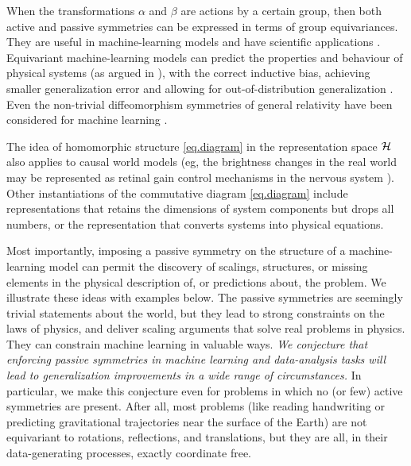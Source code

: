 \documentclass[11pt]{article}
\begin{document}
When the transformations $\alpha$ and $\beta$ are actions by a certain group, then both active and passive symmetries can be expressed in terms of group equivariances.
They are useful in machine-learning models \cite{cohen2016group, kondor2018convolution, thomas2018tensor, geiger2022e3nn, finzi2020generalizing, finzi2021practical} and have scientific applications \cite{batzner20223, musaelian2022learning, stark2022equibind, yu-physics, wang2022approximately}.
Equivariant machine-learning models can predict the properties and behaviour of physical systems (as argued in \cite{cheng2019covariance}), with the correct inductive bias, achieving smaller generalization error \cite{bietti2021sample, elesedy2021provably, elesedy2021kernel, mei2021learning} and allowing for out-of-distribution generalization \cite{villar2022dimensionless}. 
Even the non-trivial diffeomorphism symmetries of general relativity have been considered for machine learning \cite{weiler}.

The idea of homomorphic structure \eqref{eq.diagram} in the representation space $\cal H$ also applies to causal world models (eg, the brightness changes in the real world may be represented as retinal gain control mechanisms in the nervous system \cite{1911.10500}).
Other instantiations of the commutative diagram \eqref{eq.diagram} include representations that retains the dimensions of system components but drops all numbers, or the representation that converts systems into physical equations.

Most importantly, imposing a passive symmetry on the structure of a machine-learning model can permit the discovery of scalings, structures, or missing elements in the physical description of, or predictions about, the problem.
We illustrate these ideas with examples below.
The passive symmetries are seemingly trivial statements about the world, but they lead to strong constraints on the laws of physics, and deliver scaling arguments that solve real problems in physics.
They can constrain machine learning in valuable ways.
\emph{We conjecture that enforcing passive symmetries in machine learning and data-analysis tasks will lead to generalization improvements in a wide range of circumstances.}
In particular, we make this conjecture even for problems in which no (or few) active symmetries are present.
After all, most problems (like reading handwriting or predicting gravitational trajectories near the surface of the Earth) are not equivariant to rotations, reflections, and translations, but they are all, in their data-generating processes, exactly coordinate free.
\end{document}
